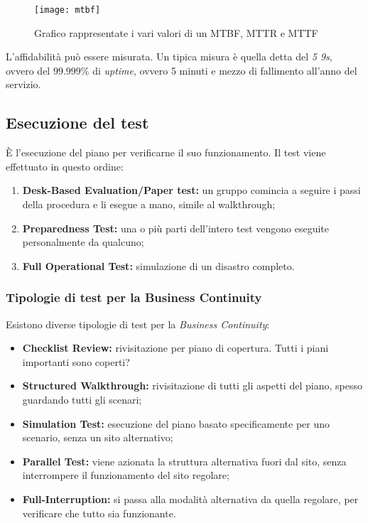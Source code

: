 \begin{figure}[H]
 \centering
 \texttt{[image: mtbf]}
 \caption{Grafico rappresentate i vari valori di un MTBF, MTTR e MTTF}
\end{figure}


L'affidabilità può essere misurata. Un tipica misura è quella detta del
\textit{5 9s}, ovvero del $99.999\%$ di \textit{uptime}, ovvero 5 minuti e
mezzo di fallimento all'anno del servizio.

\subsection{Esecuzione del test}

È l'esecuzione del piano per verificarne il suo funzionamento.
Il test viene effettuato in questo ordine:
\begin{enumerate}
  \item \textbf{Desk-Based Evaluation/Paper test:} un gruppo comincia a seguire i passi della procedura e li esegue a mano,
simile al walkthrough;
  \item \textbf{Preparedness Test:} una o più parti dell'intero test vengono eseguite personalmente da qualcuno;
  \item \textbf{Full Operational Test:} simulazione di un disastro completo.
\end{enumerate}

\subsubsection{Tipologie di test per la Business Continuity}

Esistono diverse tipologie di test per la \textit{Business Continuity}:
\begin{itemize}
  \item \textbf{Checklist Review:} rivisitazione per piano di copertura. Tutti i piani importanti sono coperti?
  \item \textbf{Structured Walkthrough:} rivisitazione di tutti gli aspetti del piano, spesso guardando tutti gli
  scenari;
  \item \textbf{Simulation Test:} esecuzione del piano basato specificamente per uno scenario, senza un sito
  alternativo;
  \item \textbf{Parallel Test:} viene azionata la struttura alternativa fuori dal sito, senza
  interrompere il funzionamento del sito regolare;
  \item \textbf{Full-Interruption:} si passa alla modalità alternativa da quella regolare, per verificare che
  tutto sia funzionante.
\end{itemize}

